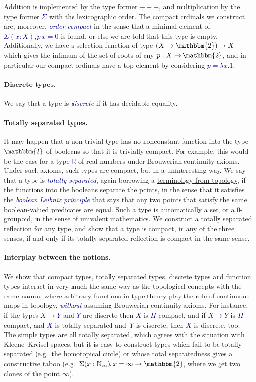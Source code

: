 \documentclass[a4paper]{easychair}
\newcommand{\db}{\textcolor{darkblue}}
\newcommand{\df}[1]{\emph{\db{#1}}}
\newcommand{\m}[1]{\db{$#1$}}
\newcommand{\N}{\mathbb{N}}
\newcommand{\NI}{\N_\infty}
\newcommand{\R}{\mathbb{R}}
\newcommand{\Two}{\mathbbm{2}}
\begin{document}
Addition is implemented by the type former \m{-+-}, and multiplication
by the type former \m{\Sigma} with the lexicographic order. The
compact ordinals we construct are, moreover, \df{order-compact} in the
sense that a minimal element of \m{\Sigma (x : X), p\,x = 0} is found,
or else we are told that this type is empty.  Additionally, we have a
selection function of type \m{(X \to \Two) \to X} which gives the
infimum of the set of roots of any \m{p : X \to \Two}, and in
particular our compact ordinals have a top element by considering \m{p
  = \lambda x. 1}.

\paragraph{Discrete types.}
We say that a type is \df{discrete} if it has decidable equality.

\paragraph{Totally separated types.}
It may happen that a non-trivial type has no nonconstant function into
the type \m{\Two} of booleans so that it is trivially compact. For
example, this would be the case for a type \m{\R} of real numbers
under Brouwerian continuity axioms. Under such axioms, such types are
compact, but in a uninteresting way. We say that a type is \df{totally
  separated}, again borrowing a
\href{https://www.encyclopediaofmath.org/index.php/Totally_separated_space}{terminology
  from topology}, if the functions into the booleans separate the
points, in the sense that it satisfies the \df{boolean Leibniz principle}
that says that any two points that satisfy the same boolean-valued
predicates are equal. Such a type is automatically a set, or a
\m{0}-groupoid, in the sense of univalent mathematics. We construct a
totally separated reflection for any type, and show that a type is
compact, in any of the three senses, if and only if its totally
separated reflection is compact in the same sense.

\paragraph{Interplay between the notions.}
We show that compact types, totally separated types, discrete types
and function types interact in very much the same way as the
topological concepts with the same names, where arbitrary functions in
type theory play the role of continuous maps in topology, \df{without}
assuming Brouwerian continuity axioms. For instance, if the types \m{X
  \to Y} and \m{Y} are discrete then \m{X} is \m{\Pi}-compact, and if
\m{X \to Y} is \m{\Pi}-compact, and \m{X} is totally separated
and~\m{Y} is discrete, then \m{X} is discrete, too. The simple types
are all totally separated, which agrees with the situation with
Kleene--Kreisel spaces, but it is easy to construct types which fail
to be totally separated (e.g.\ the homotopical circle) or whose total
separatedness gives a constructive taboo (e.g.\ \m{\Sigma (x : \NI), x =
  \infty \to \Two}, where we get two clones of the point \m{\infty}).
\end{document}
